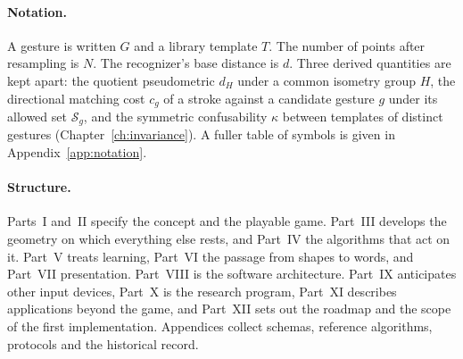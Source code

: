 \paragraph{Notation.} A gesture is written $G$ and a library template $T$. The number of points after resampling is $N$. The recognizer's base distance is $d$. Three derived quantities are kept apart: the quotient pseudometric $d_H$ under a common isometry group $H$, the directional matching cost $c_g$ of a stroke against a candidate gesture $g$ under its allowed set $\mathcal S_g$, and the symmetric confusability $\kappa$ between templates of distinct gestures (Chapter~\ref{ch:invariance}). A fuller table of symbols is given in Appendix~\ref{app:notation}.

\paragraph{Structure.} Parts~I and~II specify the concept and the playable game. Part~III develops the geometry on which everything else rests, and Part~IV the algorithms that act on it. Part~V treats learning, Part~VI the passage from shapes to words, and Part~VII presentation. Part~VIII is the software architecture. Part~IX anticipates other input devices, Part~X is the research program, Part~XI describes applications beyond the game, and Part~XII sets out the roadmap and the scope of the first implementation. Appendices collect schemas, reference algorithms, protocols and the historical record.
